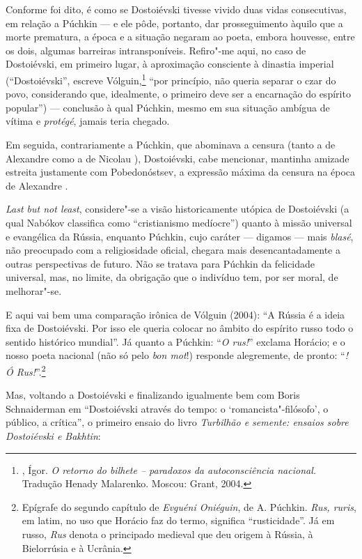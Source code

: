 Conforme foi dito, é como se Dostoiévski tivesse vivido duas vidas
consecutivas, em relação a Púchkin --- e ele pôde, portanto, dar
prosseguimento àquilo que a morte prematura, a época e a situação
negaram ao poeta, embora houvesse, entre os dois, algumas
barreiras intransponíveis. Refiro"-me aqui, no caso de
Dostoiévski, em primeiro lugar, à aproximação consciente
à dinastia imperial (``Dostoiévski'', escreve
Vólguin,\footnote{, Ígor. \emph{O
retorno do bilhete -- paradoxos da autoconsciência
nacional.} Tradução Henady Malarenko. Moscou: Grant, 2004.} ``por
princípio, não queria separar o czar do povo, considerando que,
idealmente, o primeiro deve ser a encarnação do espírito popular'') --- conclusão à qual Púchkin, mesmo em sua situação ambígua de vítima e \emph{protégé}, jamais teria chegado.

Em seguida, contrariamente a Púchkin, que abominava a censura
(tanto a de Alexandre  como a de Nicolau ),
Dostoiévski, cabe mencionar, mantinha amizade estreita justamente com Pobedonóstsev, a expressão máxima da censura na época de Alexandre .

\emph{Last but not least}, considere"-se a visão historicamente utópica de Dostoiévski (a qual
Nabókov classifica como ``cristianismo medíocre'') quanto à
missão universal e evangélica da Rússia, enquanto Púchkin, cujo
caráter --- digamos --- mais \emph{blasé}, não preocupado com a
religiosidade oficial, chegara mais desencantadamente a outras
perspectivas de futuro. Não se tratava para Púchkin da felicidade
universal, mas, no limite, da obrigação que o indivíduo tem, por
ser moral, de melhorar"-se.

E aqui vai bem uma comparação irônica de Vólguin (2004): ``A
Rússia é a ideia fixa de Dostoiévski. Por isso ele queria colocar no
âmbito do espírito russo todo o sentido histórico mundial''.
Já quanto a Púchkin: ``\emph{O rus!}'' exclama Horácio; e o nosso poeta nacional (não só pelo \emph{bon mot}!) responde alegremente, de pronto: ``\emph{{}! Ó Rus!}''.\footnote{Epígrafe do segundo capítulo de \emph{Evguéni Oniéguin}, de A. Púchkin. \emph{Rus, ruris}, em latim, no uso que Horácio faz do termo, significa ``rusticidade''. Já em russo, \emph{Rus} denota o principado medieval que deu origem à Rússia, à Bielorrúsia e à Ucrânia.}

Mas, voltando a Dostoiévski e finalizando igualmente bem com Boris
Schnaiderman em ``Dostoiévski através do tempo: o
`romancista"-filósofo', o público, a crítica'', o primeiro
ensaio do livro \emph{Turbilhão e semente: ensaios sobre
Dostoiévski e Bakhtin}:

